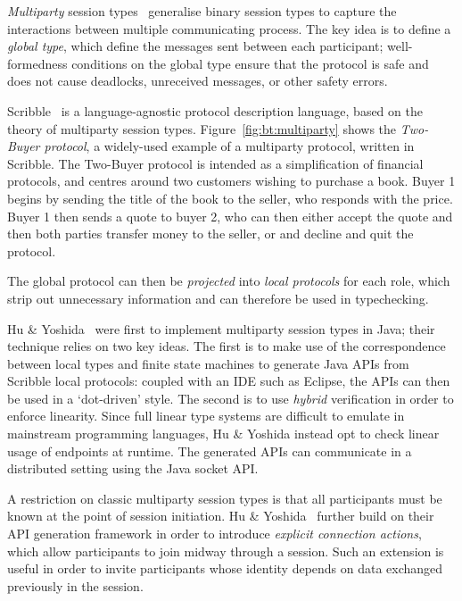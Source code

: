 \documentclass[
graybox,
envcountchap
]{svmult}
\begin{document}
\begin{bibunit}
\emph{Multiparty} session types~\cite{HondaYC16:mpst} generalise binary session types to
capture the interactions between multiple communicating process. The key idea is
to define a \emph{global type}, which define the messages sent between each
participant; well-formedness conditions on the global type ensure that the
protocol is safe and does not cause deadlocks, unreceived messages, or other
safety errors.

Scribble~\cite{YoshidaHNN13:scribble} is a language-agnostic protocol description language, based
on the theory of multiparty session types. Figure~\ref{fig:bt:multiparty} shows
the \emph{Two-Buyer protocol}, a widely-used example of a multiparty protocol,
written in Scribble. The Two-Buyer protocol is intended as a simplification of
financial protocols, and centres around two customers wishing to purchase a
book. Buyer 1 begins by sending the title of the book to the seller, who
responds with the price. Buyer 1 then sends a quote to buyer 2, who can then
either accept the quote and then both parties transfer money to the seller, or
and decline and quit the protocol.

The global protocol can then be \emph{projected} into \emph{local protocols} for
each role, which strip out unnecessary information and can therefore be used in
typechecking.

  Hu \& Yoshida~\cite{HuY16:hybrid} were first to implement multiparty session
  types in Java; their technique relies on two key ideas. The first is to
  make use of the correspondence between local types and finite state machines
  to generate Java APIs from Scribble local protocols: coupled with an IDE such
  as Eclipse, the APIs can then be used in a `dot-driven' style. The second is
  to use \emph{hybrid} verification in order to enforce linearity. Since full
  linear type systems are difficult to emulate in mainstream programming
  languages, Hu \& Yoshida instead opt to check linear usage of endpoints at
  runtime. The generated APIs can communicate in a distributed setting using the
  Java socket API.

  A restriction on classic multiparty session types is that all participants
  must be known at the point of session initiation.  Hu \&
  Yoshida~\cite{HuY17:explicit} further build on their API generation framework
  in order to introduce \emph{explicit connection actions}, which allow
  participants to join midway through a session. Such an extension is useful in
  order to invite participants whose identity depends on data exchanged
  previously in the session.


\end{bibunit}
\end{document}
